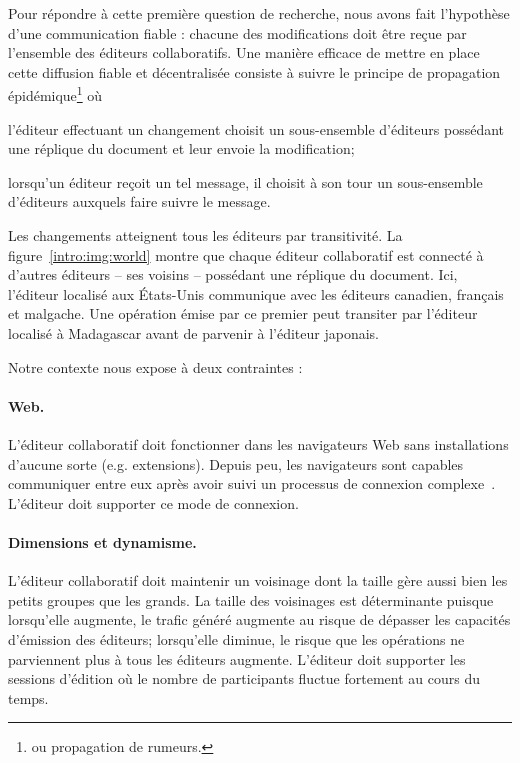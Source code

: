 Pour répondre à cette première question de recherche, nous avons fait
l'hypothèse d'une communication fiable : chacune des modifications doit être
reçue par l'ensemble des éditeurs collaboratifs.
Une manière efficace de mettre en place cette diffusion fiable et décentralisée
consiste à suivre le principe de propagation épidémique\footnote{ou propagation
  de rumeurs.}  où
\begin{inparaenum}[(i)]
\item l'éditeur effectuant un changement choisit un sous-ensemble d'éditeurs
  possédant une réplique du document et leur envoie la modification;
\item lorsqu'un éditeur reçoit un tel message, il choisit à son tour un
  sous-ensemble d'éditeurs auxquels faire suivre le message.
\end{inparaenum}
Les changements atteignent tous les éditeurs par transitivité.
La figure~\ref{intro:img:world} montre que chaque éditeur collaboratif est
connecté à d'autres éditeurs -- ses voisins -- possédant une réplique du
document. Ici, l'éditeur localisé aux États-Unis communique avec les éditeurs
canadien, français et malgache.
Une opération émise par ce premier peut transiter par l'éditeur localisé à
Madagascar avant de parvenir à l'éditeur japonais. 

\noindent Notre contexte nous expose à deux contraintes :

\paragraph{Web.} L'éditeur collaboratif doit fonctionner dans les navigateurs
Web sans installations d'aucune sorte (e.g. extensions). Depuis peu, les
navigateurs sont capables communiquer entre eux après avoir suivi un processus
de connexion complexe~\cite{webrtc}. L'éditeur doit supporter ce mode de
connexion.

\paragraph{Dimensions et dynamisme.} L'éditeur collaboratif doit maintenir un
voisinage dont la taille gère aussi bien les petits groupes que les grands.  La
taille des voisinages est déterminante puisque lorsqu'elle augmente, le trafic
généré augmente au risque de dépasser les capacités d'émission des éditeurs;
lorsqu'elle diminue,
le risque que les opérations ne parviennent plus à tous les éditeurs augmente.
L'éditeur doit supporter les sessions d'édition où le nombre de participants
fluctue fortement au cours du temps.

